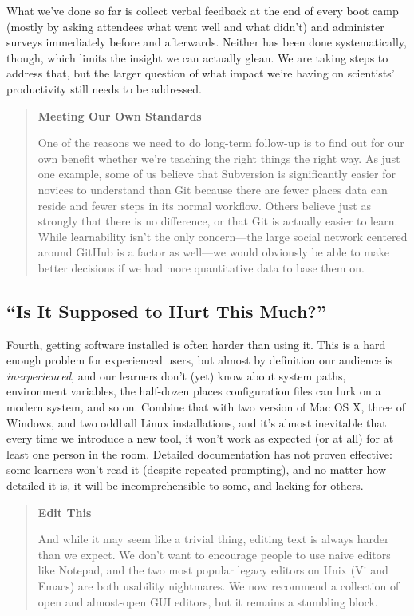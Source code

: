 \documentclass[10pt,a4paper,twocolumn]{article}
\begin{document}
What we've done so far is collect verbal feedback at the end of every
boot camp (mostly by asking attendees what went well and what didn't)
and administer surveys immediately before and afterwards. Neither has
been done systematically, though, which limits the insight we can
actually glean. We are taking steps to address that, but the larger
question of what impact we're having on scientists' productivity still
needs to be addressed.

\begin{quote}
\textbf{Meeting Our Own Standards}

One of the reasons we need to do long-term follow-up is to find out for
our own benefit whether we're teaching the right things the right way.
As just one example, some of us believe that Subversion is significantly
easier for novices to understand than Git because there are fewer places
data can reside and fewer steps in its normal workflow. Others believe
just as strongly that there is no difference, or that Git is actually
easier to learn. While learnability isn't the only concern---the large
social network centered around GitHub is a factor as well---we would
obviously be able to make better decisions if we had more quantitative
data to base them on.
\end{quote}

\subsection*{``Is It Supposed to Hurt This Much?''}

Fourth, getting software installed is often harder than using it. This
is a hard enough problem for experienced users, but almost by definition
our audience is \emph{inexperienced}, and our learners don't (yet) know
about system paths, environment variables, the half-dozen places
configuration files can lurk on a modern system, and so on. Combine that
with two version of Mac OS X, three of Windows, and two oddball Linux
installations, and it's almost inevitable that every time we introduce a
new tool, it won't work as expected (or at all) for at least one person
in the room. Detailed documentation has not proven effective: some
learners won't read it (despite repeated prompting), and no matter how
detailed it is, it will be incomprehensible to some, and lacking for
others.

\begin{quote}
\textbf{Edit This}

And while it may seem like a trivial thing, editing text is always
harder than we expect. We don't want to encourage people to use naive
editors like Notepad, and the two most popular legacy editors on Unix
(Vi and Emacs) are both usability nightmares. We now recommend a
collection of open and almost-open GUI editors, but it remains a
stumbling block.
\end{quote}
\end{document}
